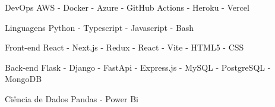 

\begin{cvskills}

  \cvskill
    {DevOps} %
    {AWS - Docker - Azure - GitHub Actions - Heroku - Vercel} %

  \cvskill
    {Linguagens} %
    {Python - Typescript - Javascript - Bash} %

  \cvskill
      {Front-end} %
      {React - Next.js - Redux - React - Vite - HTML5 - CSS} %

  \cvskill
    {Back-end} %
    {Flask - Django - FastApi - Express.js -  MySQL - PostgreSQL - MongoDB} %

  \cvskill
    {Ciência de Dados} %
    {Pandas - Power Bi} %

\end{cvskills}
